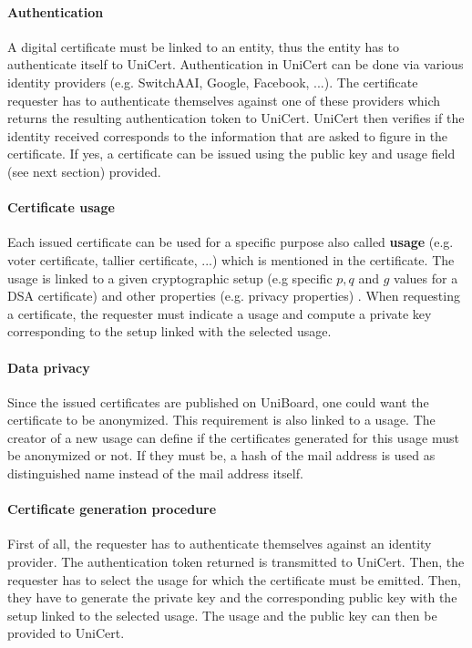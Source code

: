 \documentclass[bibtotoc,halfparskip,oneside]{scrreprt}
\begin{document}
\paragraph*{Authentication} A digital certificate must be linked to an entity, thus the entity has to authenticate itself to UniCert. Authentication in UniCert can be done via various identity providers (e.g. SwitchAAI, Google, Facebook, ...). The certificate requester has to authenticate themselves against one of these providers which returns the resulting authentication token to UniCert. UniCert then verifies if the identity received corresponds to the information that are asked to figure in the certificate. If yes, a certificate can be issued using the public key and usage field (see next section) provided.


\paragraph*{Certificate usage} Each issued certificate can be used for a specific purpose also called \textbf{usage} (e.g. voter certificate, tallier certificate, ...) which is mentioned in the certificate. The usage is linked to a given cryptographic setup (e.g specific $p,q$ and $g$ values for a DSA certificate) and other properties (e.g. privacy properties) . When requesting a certificate, the requester must indicate a usage and compute a private key corresponding to the setup linked with the selected usage. 

\paragraph*{Data privacy} Since the issued certificates are published on UniBoard, one could want the certificate to be anonymized. This requirement is also linked to a usage. The creator of a new usage can define if the certificates generated for this usage must be anonymized or not. If they must be, a hash of the mail address is used as distinguished name instead of the mail address itself.

\paragraph*{Certificate generation procedure} First of all, the requester has to authenticate themselves against an identity provider. The authentication token returned is transmitted to UniCert. Then, the requester has to select the usage for which the certificate must be emitted. Then, they have to generate the private key and the corresponding public key with the setup linked to the selected usage. The usage and the public key can then be provided to UniCert.
\end{document}

